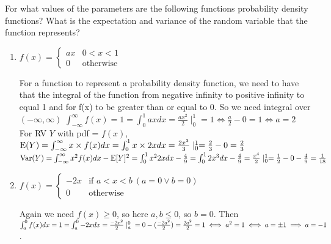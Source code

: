 \question For what values of the parameters are the following functions 
probability density functions? What is the expectation and variance of 
the random variable that the function represents?
\begin{enumerate}[label=(\alph*)]
    \item $f(x) = \begin{cases} ax & 0 < x < 1 \\ 0 & \text{otherwise} 
    \end{cases}$
 	\begin{solution}[5.2cm]
For a function to represent a probability density function, we need to 
have that the integral of the function from negative infinity to positive 
infinity to equal 1 and for f(x) to be greater than or equal to 0. So 
we need integral over $(-\infty, \infty)$ $ \int_{-\infty}^\infty f(x) = 1 
= \int_{0}^{1} ax dx = \frac{ax^2}{2} \mid_{0}^{1} = 1 \iff  \frac{a}{2} - 
0 = 1 \iff a = 2$ \\
For RV $Y$ with pdf = $f(x)$, 
$\text{E}(Y) = \int_{-\infty}^{\infty} x \times f(x) dx = \int_{0}^{1} x \times 
2x dx = \frac{2x^3}{3} \mid_{0}^{1} = \frac{2}{3} - 0 = \frac{2}{3}$ \\
$\text{Var}(Y) = \int_{-\infty}^{\infty} x^2 f(x) dx - \text{E}[Y]^2 = 
\int_{0}^{1} x^2 2x dx - \frac{4}{9}= \int_{0}^{1} 2x^3 dx - 
\frac{4}{9}= \frac{x^4}{2} \mid_{0}^{1} = \frac{1}{2} - 0 -\frac{4}{9} 
= \frac{1}{18}$
	\end{solution}
    
\item $f(x) = \begin{cases} -2x & \text{if } a < x < b\ (a = 0 \lor b 
= 0)\\ 0 & \text{otherwise} \end{cases}$
\begin{solution}[5.2cm]
Again we need $f(x) \ge 0$, so here $a, b \le 0$, so $b=0$.
        Then 
$\int_{a}^{0} f(x) dx = 1 = \int_{a}^{0} -2x dx = \frac{-2x^2}{2} \mid_{a}^{0}  \\
= 0 - (\frac{-2a^2}{2}) = \frac{2a^2}{2} = 1 \iff a^2 = 1 \iff a \\
= \pm 1 \implies a = -1$. \\
\end{solution}


\end{enumerate}
